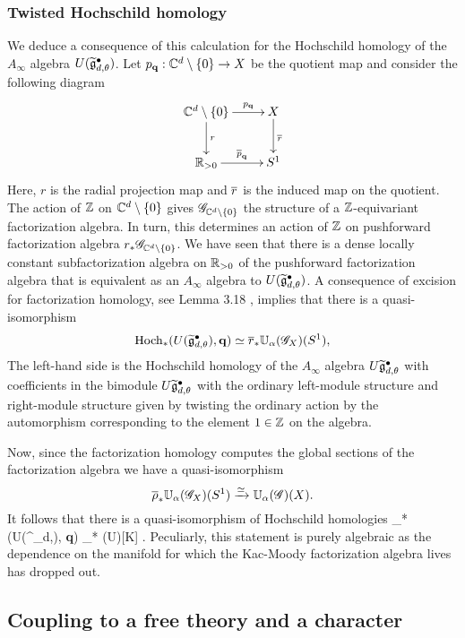 \subsubsection{Twisted Hochschild homology}
We deduce a consequence of this calculation for the Hochschild homology of the $A_\infty$ algebra $U(\Tilde{\fg}^\bullet_{d,\theta})$.
Let $p_{\bf q} :  \CC^d \setminus \{0\} \to X$ be the quotient map and consider the following diagram
\[
\xymatrix{
\CC^d \setminus \{0\} \ar[r]^-{p_{\bf q}} \ar[d]^-{r} & X \ar[d]^{\Bar{r}} \\
\RR_{>0} \ar[r]^-{\Bar{p}_{\bf q}} & S^1
}
\]
Here, $r$ is the radial projection map and $\Bar{r}$ is the induced map on the quotient.
The action of $\ZZ$ on $\CC^d \setminus\{0\}$ gives $\sG_{\CC^d \setminus \{0\}}$ the structure of a $\ZZ$-equivariant factorization algebra. 
In turn, this determines an action of $\ZZ$ on pushforward factorization algebra $r_* \sG_{\CC^d \setminus \{0\}}$.
We have seen that there is a dense locally constant subfactorization algebra on $\RR_{>0}$ of the pushforward factorization algebra that is equivalent as an $A_\infty$ algebra to $U(\Tilde{\fg}^\bullet_{d,\theta})$.
A consequence of excision for factorization homology, see Lemma 3.18 \cite{AFTopMan}, implies that there is a quasi-isomorphism
\[
\Hoch_*(U(\Tilde{\fg}^\bullet_{d,\theta}), {\bf q}) \simeq \Bar{r}_* \UU_\alpha(\sG_X) (S^1) ,
\]
The left-hand side is the Hochschild homology of the $A_\infty$ algebra $U \Tilde{\fg}_{d,\theta}^\bullet$ with coefficients in the bimodule $U \Tilde{\fg}_{d, \theta}^\bullet$ with the ordinary left-module structure and right-module structure given by twisting the ordinary action by the automorphism corresponding to the element $1 \in \ZZ$ on the algebra.

Now, since the factorization homology computes the global sections of the factorization algebra we have a quasi-isomorphism
\[
\Bar{\rho}_* \UU_\alpha(\sG_X) (S^1) \xto{\simeq} \UU_{\alpha} (\sG)(X) .
\]
It follows that there is a quasi-isomorphism of Hochschild homologies
\beqn\label{hoch1}
\Hoch_*(U(\Tilde{\fg}^\bullet_{d,\theta}), {\bf q}) \simeq \Hoch_* (U\fg)[K] .
\eeqn
Peculiarly, this statement is purely algebraic as the dependence on the manifold for which the Kac-Moody factorization algebra lives has dropped out.

\subsection{Coupling to a free theory and a character}

